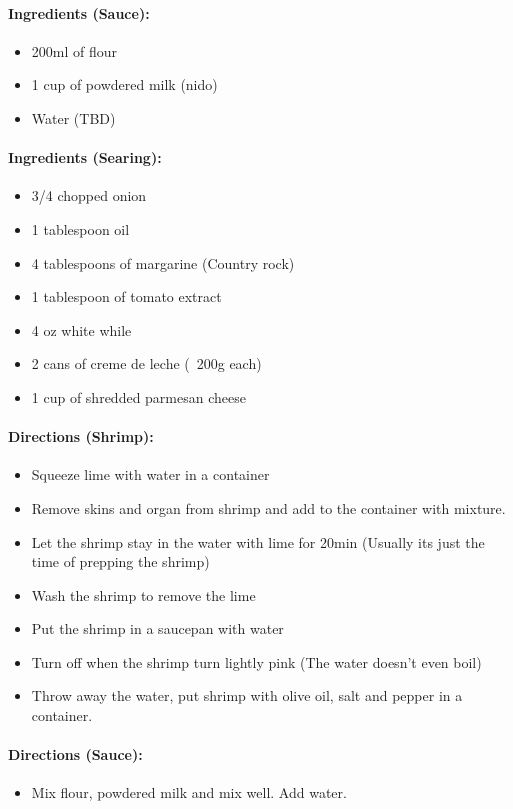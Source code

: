 \documentclass{article}
\begin{document}
\paragraph{Ingredients (Sauce):}
\begin{itemize}
	\item 200ml of flour
	\item 1 cup of powdered milk (nido)
	\item Water (TBD)
\end{itemize}

\paragraph{Ingredients (Searing):}
\begin{itemize}
	\item 3/4 chopped onion
	\item 1 tablespoon oil
	\item 4 tablespoons of margarine (Country rock)
	\item 1 tablespoon of tomato extract
	\item 4 oz white while
	\item 2 cans of creme de leche (~200g each)
	\item 1 cup of shredded parmesan cheese
\end{itemize}

\paragraph{Directions (Shrimp):}
\begin{itemize}
	\item Squeeze lime with water in a container
	\item Remove skins and organ from shrimp and add to the container with mixture.
	\item Let the shrimp stay in the water with lime for 20min (Usually its just the time of prepping the shrimp)
	\item Wash the shrimp to remove the lime
	\item Put the shrimp in a saucepan with water
	\item Turn off when the shrimp turn lightly pink (The water doesn't even boil)
	\item Throw away the water, put shrimp with olive oil, salt and pepper in a container.
\end{itemize}

\paragraph{Directions (Sauce):}
\begin{itemize}
	\item Mix flour, powdered milk and mix well. Add water.
\end{itemize}
\end{document}
